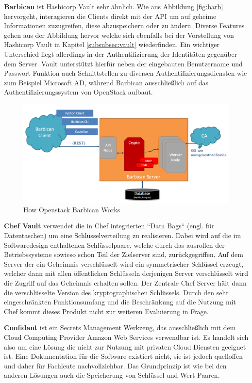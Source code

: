 \documentclass[
book,
a4paper,   
titlepage,  
halfparskip,
12pt        
]{scrartcl}
\begin{document}
\begin{onehalfspacing}
\textbf{Barbican} ist Hashicorp Vault sehr ähnlich. Wie aus Abbildung \vref{fig:barb} hervorgeht, interagieren die Clients direkt mit der \ac{API} um auf geheime Informationen zuzugreifen, diese abzuspeichern oder zu ändern. Diverse Features gehen aus der Abbildung hervor welche sich ebenfalls bei der Vorstellung von Hashicorp Vault in Kapitel \vref{subsubsec:vault} wiederfinden. Ein wichtiger Unterschied liegt allerdings in der Authentifizierung der Identitäten gegenüber dem Server. Vault unterstützt hierfür neben der eingebauten Benutzername und Passwort Funktion auch Schnittstellen zu diversen Authentifizierungsdiensten wie zum Beispiel Microsoft \ac{AD}, während Barbican ausschließlich auf das Authentifizierungssystem von OpenStack aufbaut.\cite[S. 4f]{barbican}
\begin{figure}[h]
	\centering
	\includegraphics[width=1\linewidth]{barbican}
	\caption[Barbican]{How Openstack Barbican Works \cite[S. 4]{barbican}}
	\label{fig:barb}
\end{figure}

\textbf{Chef Vault} verwendet die in Chef integrierten ``Data Bags`` (engl. für Datentaschen) um eine Schlüsselverteilung zu realisieren. Dabei wird auf die im Softwaredesign enthaltenen Schlüsselpaare, welche durch das ausrollen der Betriebssysteme sowieso schon Teil der Zielserver sind, zurückgegriffen. Auf dem Server der ein Geheimnis verschlüsselt wird ein symmetrischer Schlüssel erzeugt, welcher dann mit allen öffentlichen Schlüsseln derjenigen Server verschlüsselt wird die Zugriff auf das Geheimnis erhalten sollen. Der Zentrale Chef Server hält dann die verschlüsselte Version des kryptographischen Schlüssels.\cite{chef} Durch den sehr eingeschränkten Funktionsumfang und die Beschränkung auf die Nutzung mit Chef kommt dieses Produkt nicht zur weiteren Evaluierung in Frage.

\textbf{Confidant} ist ein Secrets Management Werkzeug, das ausschließlich mit dem Cloud Computing Provider Amazon Web Services verwendbar ist. Es handelt sich also um eine Lösung die nicht zur Nutzung mit privaten Cloud Diensten geeignet ist. Eine Dokumentation für die Software existiert nicht, sie ist jedoch quelloffen und daher für Fachleute nachvollziehbar. Das Grundprinzip ist wie bei den anderen Lösungen auch die Speicherung von Schlüssel und Wert Paaren.\cite{lyft}


\end{onehalfspacing}
\end{document}
